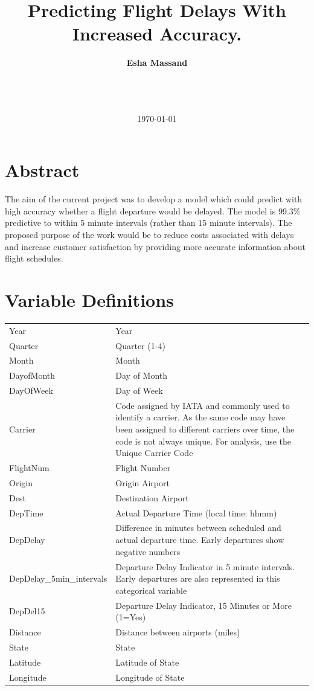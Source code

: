 \documentclass[a4paper, 10pt]{article}
\begin{document}
\LARGE\title{Predicting Flight Delays With Increased Accuracy.}

\LARGE\author{\textbf{Esha Massand}\\
\date{\mydate\today}
\\\
}

\normalsize


\maketitle


\section*{Abstract}
\begin{justify}
The aim of the current project was to develop a model which could predict with high accuracy whether a flight departure would be delayed. The model is 99.3\% predictive to within 5 minute intervals (rather than 15 minute intervals). The proposed purpose of the work would be to reduce costs associated with delays and increase customer satisfaction by providing more accurate information about flight schedules. 
\end{justify}


\clearpage
\tableofcontents
\clearpage

\section{Variable Definitions}\label{variables}

\begin{tabular}{l p{11cm}  }
Year& Year\\
Quarter& Quarter (1-4)\\
Month& Month\\
DayofMonth& Day of Month\\
DayOfWeek& Day of Week\\
Carrier& Code assigned by IATA and commonly used to identify a carrier. As the same code may have been assigned to different carriers over time, the code is not always unique. For analysis, use the Unique Carrier Code\\
FlightNum& Flight Number\\
Origin& Origin Airport\\
Dest& Destination Airport\\
DepTime& Actual Departure Time (local time: hhmm)\\
DepDelay& Difference in minutes between scheduled and actual departure time. Early departures show negative numbers\\
DepDelay\_5min\_intervals & Departure Delay Indicator in 5 minute intervals. Early departures are also represented in this categorical variable\\
DepDel15& Departure Delay Indicator, 15 Minutes or More (1=Yes)\\
Distance& Distance between airports (miles)\\
State & State\\
Latitude & Latitude of State\\
Longitude & Longitude of State\\
\end{tabular}
\end{document}
